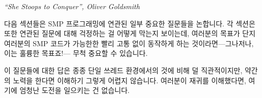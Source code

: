 
%
	 {\emph{``She Stoops to Conquer'', Oliver Goldsmith}}

다음 섹션들은 SMP 프로그래밍에 연관된 일부 중요한 질문들을 논합니다.
각 섹션은 또한 연관된 질문에 대해 걱정하는 걸 어떻게 막는지 보이는데, 여러분의
목표가 단지 여러분의 SMP 코드가 가능한한 빨리 고통 없이 동작하게 하는
것이라면---그나저나, 이는 훌륭한 목표죠!--- 무척 중요할 수 있습니다.

이 질문들에 대한 답은 종종 단일 쓰레드 환경에서의 것에 비해 덜 직관적이지만,
약간의 노력을 한다면 이해하기 그렇게 어렵지 않습니다.
여러분이 재귀를 이해했다면, 여기에 엄청난 도전을 일으키는 건 없습니다.

\iffalse

The following sections discuss some important questions relating to
SMP programming.
Each section also shows how to avoid worrying about
the corresponding question, which can be extremely important if
your goal is to simply get your SMP code working as quickly and
painlessly as possible---which is an excellent goal, by the way!

Although the answers to these questions are often less
intuitive than they would be in a single-threaded setting,
with a bit of work, they are not that difficult to understand.
If you managed to master recursion, there is nothing here that should
pose an overwhelming challenge.

\fi








